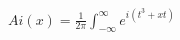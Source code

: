 \documentclass[preview]{standalone}
\begin{document}
\begin{align*}
Ai(x)=\displaystyle \frac{1}{2\pi}\int_{-\infty}^{\infty}e^{i(t^3+xt)}
\end{align*}
\end{document}
